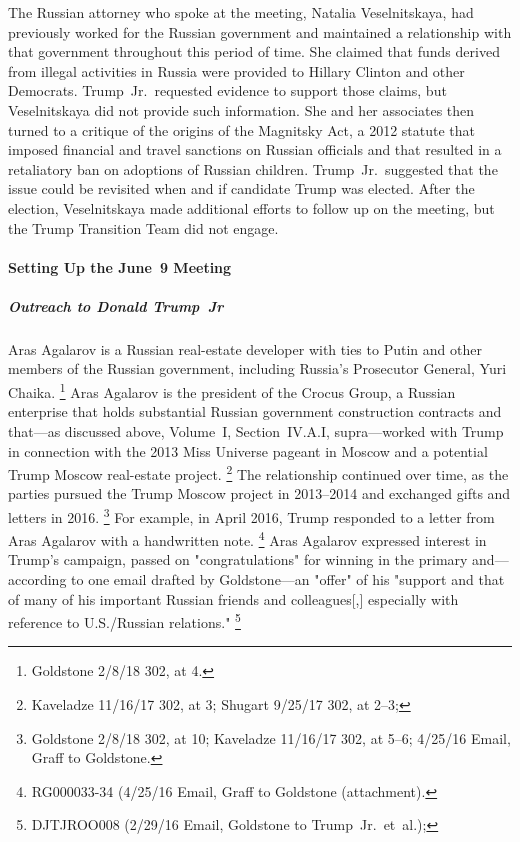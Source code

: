 The Russian attorney who spoke at the meeting, Natalia Veselnitskaya, had previously worked for the Russian government and maintained a relationship with that government throughout this period of time.
She claimed that funds derived from illegal activities in Russia were provided to Hillary Clinton and other Democrats.
Trump~Jr.\ requested evidence to support those claims, but Veselnitskaya did not provide such information.
She and her associates then turned to a critique of the origins of the Magnitsky Act, a 2012 statute that imposed financial and travel sanctions on Russian officials and that resulted in a retaliatory ban on adoptions of Russian children.
Trump~Jr.\ suggested that the issue could be revisited when and if candidate Trump was elected.
After the election, Veselnitskaya made additional efforts to follow up on the meeting, but the Trump Transition Team did not engage.

\paragraph{Setting Up the June~9 Meeting}

\subparagraph{Outreach to Donald Trump~Jr}

Aras Agalarov is a Russian real-estate developer with ties to Putin and other members of the Russian government, including Russia's Prosecutor General, Yuri Chaika.%
\footnote{ Goldstone 2/8/18 302, at 4.}
Aras Agalarov is the president of the Crocus Group, a Russian enterprise that holds substantial Russian government construction contracts and that---as discussed above, Volume~I, Section~IV.A.I, supra---worked with Trump in connection with the 2013 Miss Universe pageant in Moscow and a potential Trump Moscow real-estate project.%
\footnote{ Kaveladze 11/16/17 302, at 3;
Shugart 9/25/17 302, at 2--3;
}
The relationship continued over time, as the parties pursued the Trump Moscow project in 2013--2014 and exchanged gifts and letters in 2016.%
\footnote{ Goldstone 2/8/18 302, at 10;
 Kaveladze 11/16/17 302, at 5--6;
4/25/16 Email, Graff to Goldstone.}
For example, in April 2016, Trump responded to a letter from Aras Agalarov with a handwritten note.%
\footnote{RG000033-34 (4/25/16 Email, Graff to Goldstone (attachment).}
Aras Agalarov expressed interest in Trump's campaign, passed on "congratulations" for winning in the primary and---according to one email drafted by Goldstone---an "offer" of his "support and that of many of his important Russian friends and colleagues[,] especially with reference to U.S./Russian relations."%
\footnote{DJTJROO008 (2/29/16 Email, Goldstone to Trump~Jr.\ et~al.);
}

